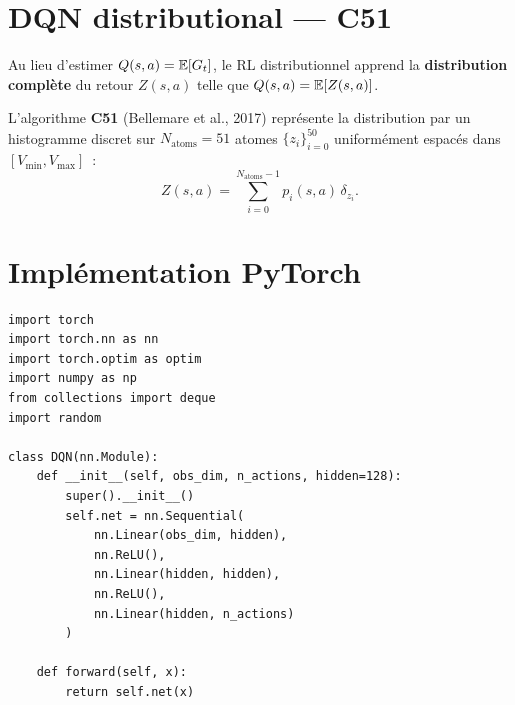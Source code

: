 \section{DQN distributional --- C51}

\begin{definition}[RL distributionnel]
Au lieu d'estimer $Q(s,a) = \mathbb{E}[G_t]$, le RL distributionnel apprend la
\textbf{distribution compl\`ete} du retour $Z(s,a)$ telle que $Q(s,a) = \mathbb{E}[Z(s,a)]$.

L'algorithme \textbf{C51} (Bellemare et al., 2017) repr\'esente la distribution
par un histogramme discret sur $N_{\text{atoms}} = 51$ atomes
$\{z_i\}_{i=0}^{50}$ uniform\'ement espac\'es dans $[V_{\min}, V_{\max}]$~:
\[
    Z(s,a) = \sum_{i=0}^{N_{\text{atoms}}-1} p_i(s,a) \, \delta_{z_i}.
\]
\end{definition}

\section{Impl\'ementation PyTorch}

\begin{codeblock}[title=\textbf{R\'eseau DQN}]
\begin{verbatim}
import torch
import torch.nn as nn
import torch.optim as optim
import numpy as np
from collections import deque
import random

class DQN(nn.Module):
    def __init__(self, obs_dim, n_actions, hidden=128):
        super().__init__()
        self.net = nn.Sequential(
            nn.Linear(obs_dim, hidden),
            nn.ReLU(),
            nn.Linear(hidden, hidden),
            nn.ReLU(),
            nn.Linear(hidden, n_actions)
        )

    def forward(self, x):
        return self.net(x)
\end{verbatim}
\end{codeblock}

